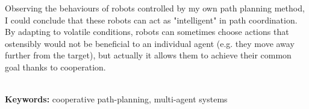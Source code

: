\begin{singlespacing}
Observing the behaviours of robots controlled by my own path planning method, I could conclude that these robots can act as "intelligent" in path coordination.
By adapting to volatile conditions, robots can sometimes choose actions that ostensibly would not be beneficial to an individual agent (e.g. they move away further from the target), but actually it allows them to achieve their common goal thanks to cooperation.

\flushbottom
\textbf{\\Keywords: }cooperative path-planning, multi-agent systems
\end{singlespacing}
